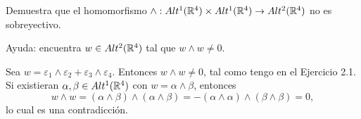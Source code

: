 \documentclass[twoside]{article}
\begin{document}
\newpage

\begin{ejercicio}{2}
Demuestra que el homomorfismo $\land: Alt^1(\mathbb{R}^4)\times Alt^1(\mathbb{R}^4)\to Alt^2(\mathbb{R}^4)$ no es sobreyectivo. 

Ayuda: encuentra $w\in Alt^2(\mathbb{R}^4)$ tal que $w\land w\neq 0$.
\end{ejercicio}
\begin{solucion}
Sea $w=\varepsilon_1\land \varepsilon_2+\varepsilon_3\land\varepsilon_4$. Entonces $w\land w\neq 0$, tal como tengo en el Ejercicio 2.1. Si existieran $\alpha,\beta\in Alt^1(\mathbb{R}^4)$ con $w=\alpha\land\beta$, entonces 
\[
w\land w=(\alpha\land\beta)\land(\alpha\land\beta)=-(\alpha\land\alpha)\land(\beta\land\beta)=0,
\]
lo cual es una contradicción.
\end{solucion}
\newpage
\end{document}

